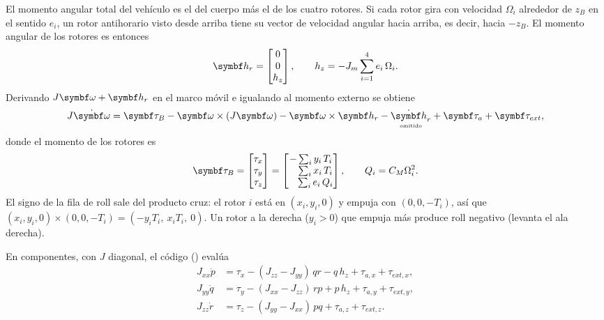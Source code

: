 El momento angular total del vehículo es el del cuerpo más el de los cuatro
rotores. Si cada rotor gira con velocidad $\Omega_i$ alrededor de $z_B$ en el
sentido $e_i$, un rotor antihorario visto desde arriba tiene su vector de
velocidad angular hacia arriba, es decir, hacia $-z_B$. El momento angular
de los rotores es entonces
\begin{equation}
\vect h_r = \begin{bmatrix}0\\0\\h_z\end{bmatrix},\qquad
h_z = -J_m\sum_{i=1}^4 e_i\,\Omega_i .
\label{eq:hr}
\end{equation}
Derivando $J\vect\omega+\vect h_r$ en el marco móvil e igualando al momento
externo se obtiene
\begin{equation}
J\dot{\vect\omega} = \vect\tau_B - \vect\omega\times(J\vect\omega)
 - \vect\omega\times\vect h_r - \underset{\scriptscriptstyle \text{omitido}}{\dot{\vect h}_r}
 + \vect\tau_a + \vect\tau_{ext},
\label{eq:euler}
\end{equation}
donde el momento de los rotores es
\begin{equation}
\vect\tau_B=\begin{bmatrix}\tau_x\\ \tau_y\\ \tau_z\end{bmatrix}
=\begin{bmatrix}
-\sum_i y_i\,T_i\\
\phantom{-}\sum_i x_i\,T_i\\
\phantom{-}\sum_i e_i\,Q_i
\end{bmatrix},\qquad Q_i=C_M\Omega_i^2 .
\label{eq:tauB}
\end{equation}
El signo de la fila de roll sale del producto cruz: el rotor $i$ está en
$(x_i,y_i,0)$ y empuja con $(0,0,-T_i)$, así que
$(x_i,y_i,0)\times(0,0,-T_i)=(-y_iT_i,\ x_iT_i,\ 0)$. Un rotor a la derecha
($y_i>0$) que empuja más produce roll negativo (levanta el ala derecha).

En componentes, con $J$ diagonal, el código ()
evalúa
\begin{align}
J_{xx}\dot p &= \tau_x - (J_{zz}-J_{yy})\,q r - q\,h_z + \tau_{a,x} + \tau_{ext,x},\nonumber\\
J_{yy}\dot q &= \tau_y - (J_{xx}-J_{zz})\,r p + p\,h_z + \tau_{a,y} + \tau_{ext,y},\label{eq:euler_comp}\\
J_{zz}\dot r &= \tau_z - (J_{yy}-J_{xx})\,p q + \tau_{a,z} + \tau_{ext,z}.\nonumber
\end{align}

